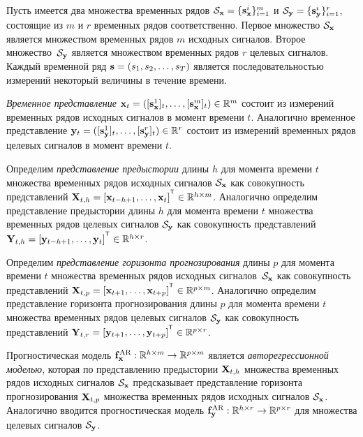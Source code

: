 \documentclass[11pt, a5paper]{dissert}
\begin{document}
Пусть имеется два множества временных рядов $\mathcal{S}_{\mathbf{x}} = \{\mathbf{s}_{\mathbf{x}}^i\}_{i=1}^m$ и $\mathcal{S}_{\mathbf{y}} = \{\mathbf{s}_{\mathbf{y}}^i\}_{i=1}^r$, состоящие из $m$ и $r$ временных рядов соответственно. 
Первое множество $\mathcal{S}_{\mathbf{x}}$ является множеством временных рядов $m$ исходных сигналов. 
Второе множество~$\mathcal{S}_{\mathbf{y}}$ является множеством временных рядов $r$ целевых сигналов.
Каждый временной ряд $\mathbf{s} = (s_1, s_2, \dots, s_T)$ является последовательностью измерений некоторый величины в течение времени. 
\begin{definition}
	 \textit{Временное представление} $\mathbf{x}_t = ([\mathbf{s}_{\mathbf{x}}^1]_t, \dots, [\mathbf{s}_{\mathbf{x}}^m]_t) \in \mathbb{R}^m$ состоит из измерений временных рядов исходных сигналов в момент времени $t$. 
	Аналогично временное представление $\mathbf{y}_t = ([\mathbf{s}_{\mathbf{y}}^1]_t, \dots, [\mathbf{s}_{\mathbf{y}}^r]_t) \in \mathbb{R}^r$ состоит из измерений временных рядов целевых сигналов в момент времени $t$.
\end{definition}
\begin{definition}
	Определим \textit{представление предыстории} длины $h$ для момента времени $t$ множества временных рядов исходных сигналов $\mathcal{S}_{\mathbf{x}}$ как совокупность представлений $\bX_{t,h} = [\bx_{t - h + 1}, \dots, \bx_{t}]^{\T} \in \bbR^{h \times m}$.
	Аналогично определим представление предыстории длины $h$ для момента времени $t$ множества временных рядов целевых сигналов $\mathcal{S}_{\mathbf{y}}$ как совокупность представлений $\bY_{t,h} = [\by_{t - h + 1}, \dots, \by_{t}]^{\T} \in \bbR^{h \times r}$.
\end{definition}
\begin{definition}
	Определим \textit{представление горизонта прогнозирования} длины $p$ для момента времени $t$ множества временных рядов исходных сигналов~$\mathcal{S}_{\mathbf{x}}$ как совокупность представлений $\bX_{t,p} = [\bx_{t + 1}, \dots, \bx_{t + p}]^{\T} \in \bbR^{p \times m}$.
	Аналогично определим представление горизонта прогнозирования длины $p$ для момента времени $t$ множества временных рядов целевых сигналов $\mathcal{S}_{\mathbf{y}}$ как совокупность представлений $\bY_{t,r} = [\by_{t + 1}, \dots, \by_{t + p}]^{\T} \in \bbR^{p \times r}$.
\end{definition}

\begin{definition}
	\label{ch1:def:autoreg_model}
	Прогностическая модель $\mathbf{f}^{\text{AR}}_{\mathbf{x}}: \mathbb{R}^{h \times m} \rightarrow \mathbb{R}^{p \times m}$ является \textit{авторегрессионной моделью}, которая по представлению предыстории $\mathbf{X}_{t,h}$ множества временных рядов исходных сигналов $\mathcal{S}_{\mathbf{x}}$ предсказывает представление горизонта прогнозирования $\mathbf{X}_{t,p}$ множества временных рядов исходных сигналов $\mathcal{S}_{\mathbf{x}}$.
	Аналогично вводится прогностическая модель $\mathbf{f}^{\text{AR}}_{\mathbf{y}}: \mathbb{R}^{h \times r} \rightarrow \mathbb{R}^{p \times r}$ для множества целевых сигналов $\mathcal{S}_{\mathbf{y}}$.
\end{definition}
\end{document}
